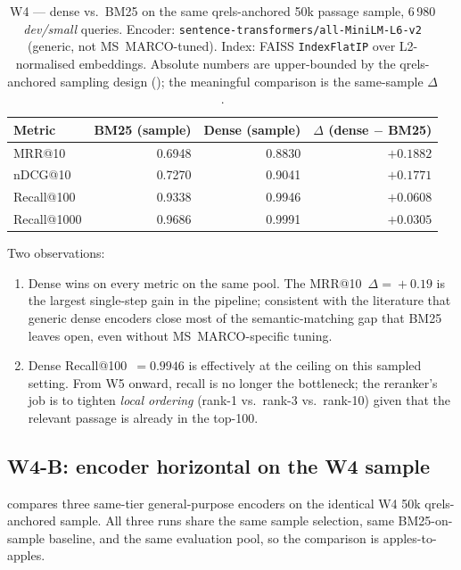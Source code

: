 \documentclass[11pt,a4paper]{article}
\makeatletter
\newcommand{\devsmall}{\textit{dev/small}}
\newcommand{\fdev}{6\,980}
\newcommand{\msmarco}{MS~MARCO}
\newcommand{\mrr}{MRR@10}
\newcommand{\ndcg}{nDCG@10}
\newcommand{\recallH}{Recall@100}
\newcommand{\recallK}{Recall@1000}
\newcommand{\bmtwofive}{BM25}
\makeatother
\begin{document}
\begin{table}[H]
  \centering
  \caption{W4 --- dense vs.\ \bmtwofive{} on the same
  qrels-anchored 50k passage sample, \fdev{} \devsmall{} queries.
  Encoder: \texttt{sentence-transformers/all-MiniLM-L6-v2} (generic,
  not \msmarco{}-tuned).  Index: FAISS \texttt{IndexFlatIP} over
  L2-normalised embeddings.  Absolute numbers are upper-bounded by
  the qrels-anchored sampling design ();
  the meaningful comparison is the same-sample $\Delta$.}
  \label{tab:w4-results}
  \begin{tabular}{lrrr}
    \toprule
    Metric        & \bmtwofive{} (sample) & Dense (sample) & $\Delta$ (dense $-$ \bmtwofive{}) \\
    \midrule
    \mrr{}        & 0.6948 & 0.8830 & $+0.1882$ \\
    \ndcg{}       & 0.7270 & 0.9041 & $+0.1771$ \\
    \recallH{}    & 0.9338 & 0.9946 & $+0.0608$ \\
    \recallK{}    & 0.9686 & 0.9991 & $+0.0305$ \\
    \bottomrule
  \end{tabular}
\end{table}

Two observations:

\begin{enumerate}
  \item Dense wins on every metric on the same pool.  The
        \mrr{}~$\Delta\!=\!+0.19$ is the largest single-step gain in
        the pipeline; consistent with the literature that generic
        dense encoders close most of the semantic-matching gap that
        \bmtwofive{} leaves open, even without
        \msmarco{}-specific tuning.
  \item Dense \recallH{}~$=0.9946$ is effectively at the ceiling on
        this sampled setting.  From W5 onward, recall is no longer
        the bottleneck; the reranker's job is to tighten
        \emph{local ordering} (rank-1 vs.\ rank-3 vs.\ rank-10) given
        that the relevant passage is already in the top-100.
\end{enumerate}

\subsection{W4-B: encoder horizontal on the W4 sample}
\label{sec:w4b}

 compares three same-tier general-purpose
encoders on the identical W4 50k qrels-anchored sample.  All three
runs share the same sample selection, same BM25-on-sample baseline,
and the same evaluation pool, so the comparison is apples-to-apples.
\end{document}
